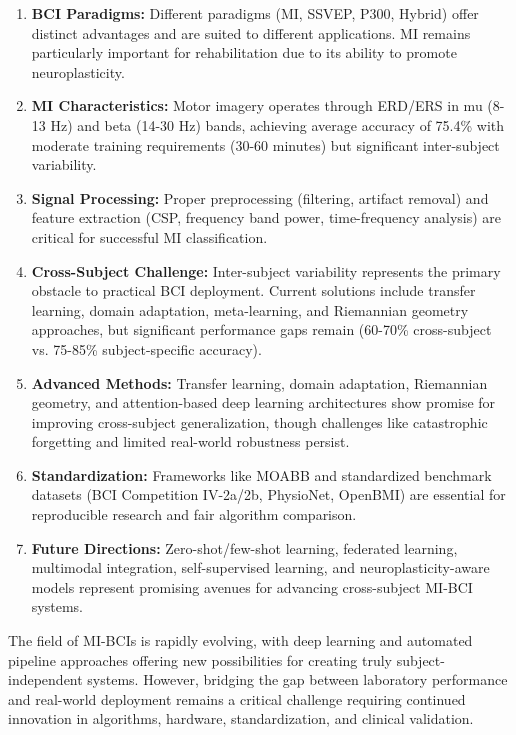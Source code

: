 \documentclass[12pt]{article}
\begin{document}
\begin{enumerate}
    \item \textbf{BCI Paradigms:} Different paradigms (MI, SSVEP, P300, Hybrid) offer distinct advantages and are suited to different applications. MI remains particularly important for rehabilitation due to its ability to promote neuroplasticity.
    
    \item \textbf{MI Characteristics:} Motor imagery operates through ERD/ERS in mu (8-13 Hz) and beta (14-30 Hz) bands, achieving average accuracy of 75.4\% with moderate training requirements (30-60 minutes) but significant inter-subject variability.
    
    \item \textbf{Signal Processing:} Proper preprocessing (filtering, artifact removal) and feature extraction (CSP, frequency band power, time-frequency analysis) are critical for successful MI classification.
    
    \item \textbf{Cross-Subject Challenge:} Inter-subject variability represents the primary obstacle to practical BCI deployment. Current solutions include transfer learning, domain adaptation, meta-learning, and Riemannian geometry approaches, but significant performance gaps remain (60-70\% cross-subject vs. 75-85\% subject-specific accuracy).
    
    \item \textbf{Advanced Methods:} Transfer learning, domain adaptation, Riemannian geometry, and attention-based deep learning architectures show promise for improving cross-subject generalization, though challenges like catastrophic forgetting and limited real-world robustness persist.
    
    \item \textbf{Standardization:} Frameworks like MOABB and standardized benchmark datasets (BCI Competition IV-2a/2b, PhysioNet, OpenBMI) are essential for reproducible research and fair algorithm comparison.
    
    \item \textbf{Future Directions:} Zero-shot/few-shot learning, federated learning, multimodal integration, self-supervised learning, and neuroplasticity-aware models represent promising avenues for advancing cross-subject MI-BCI systems.
\end{enumerate}

The field of MI-BCIs is rapidly evolving, with deep learning and automated pipeline approaches offering new possibilities for creating truly subject-independent systems. However, bridging the gap between laboratory performance and real-world deployment remains a critical challenge requiring continued innovation in algorithms, hardware, standardization, and clinical validation.
\end{document}

